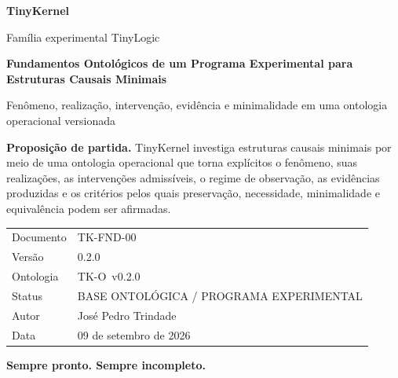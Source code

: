 \documentclass[11pt,a4paper]{article}
\newcommand{\TKProject}{TinyKernel}
\newcommand{\TKDocID}{TK-FND-00}
\newcommand{\TKVersion}{0.2.0}
\newcommand{\TKOntology}{TK-O}
\newcommand{\TKDate}{09 de setembro de 2026}
\newcommand{\TKStatus}{BASE ONTOLÓGICA / PROGRAMA EXPERIMENTAL}
\newcommand{\TKMotto}{Sempre pronto. Sempre incompleto.}
\begin{document}
\begin{titlepage}
\pagecolor{TKDark}
\color{white}

\vspace*{1.5cm}

{\sffamily\small
\textbf{\TKProject}\par
Família experimental TinyLogic\par}

\vspace{1.8cm}

{\sffamily\bfseries\fontsize{27}{32}\selectfont
Fundamentos Ontológicos de um Programa Experimental para Estruturas Causais Minimais\par}

\vspace{0.6cm}

{\sffamily\fontsize{14}{19}\selectfont\color{white!78}
Fenômeno, realização, intervenção, evidência e minimalidade em uma ontologia operacional versionada\par}

\vspace{1.2cm}

\begin{tcolorbox}[
	enhanced,
	colback=white!8!TKDark,
	colframe=white!28!TKDark,
	boxrule=0.6pt,
	arc=2mm,
	left=4mm,right=4mm,top=3mm,bottom=3mm
	]
\color{white}
\textbf{Proposição de partida.}
TinyKernel investiga estruturas causais minimais por meio de uma ontologia operacional
que torna explícitos o fenômeno, suas realizações, as intervenções admissíveis, o regime
de observação, as evidências produzidas e os critérios pelos quais preservação,
necessidade, minimalidade e equivalência podem ser afirmadas.
\end{tcolorbox}

\vfill

{\sffamily
\begin{tabular}{@{}ll@{}}
Documento & \TKDocID \\
Versão & \TKVersion \\
Ontologia & \TKOntology\ v\TKVersion \\
Status & \TKStatus \\
Autor & José Pedro Trindade \\
Data & \TKDate \\
\end{tabular}
}

\vspace{1.1cm}

{\sffamily\bfseries\color{white!92}\TKMotto\par}

\end{titlepage}
\nopagecolor
\color{TKInk}
\end{document}
